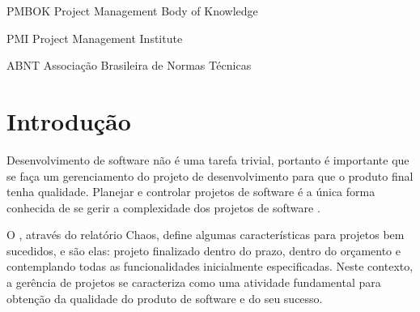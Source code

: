 \documentclass[
    12pt,               %
    openright,          %
    twoside,            %
    a4paper,            %
    chapter=TITLE,     %
    english,            %
    spanish,            %
    portuguese              %
    ]{abntex2}
\begin{document}




\label{lista ilustrações}
  \listoffigures*
  \cleardoublepage


\label{lista tabelas}
  \listoftables*
  \cleardoublepage


\label{lista siglas}
\begin{siglas}
	\item[PMBOK] Project Management Body of Knowledge
	\item[PMI] Project Management Institute
	\item[ABNT] Associação Brasileira de Normas Técnicas
\end{siglas}


\tableofcontents

\textual


\chapter{Introdução}

Desenvolvimento de software não é uma tarefa trivial, portanto é importante que se faça um gerenciamento do projeto de desenvolvimento para que o produto final tenha qualidade. Planejar e controlar projetos de software é a única forma conhecida de se gerir a complexidade dos projetos de software \cite[p.~484]{pressman2006}.


O , através do relatório Chaos, define algumas características para projetos bem sucedidos, e são elas: projeto finalizado dentro do prazo, dentro do orçamento e contemplando todas as funcionalidades inicialmente especificadas. Neste contexto, a gerência de projetos se caracteriza como uma atividade fundamental para obtenção da qualidade do produto de software e do seu sucesso.
\end{document}
